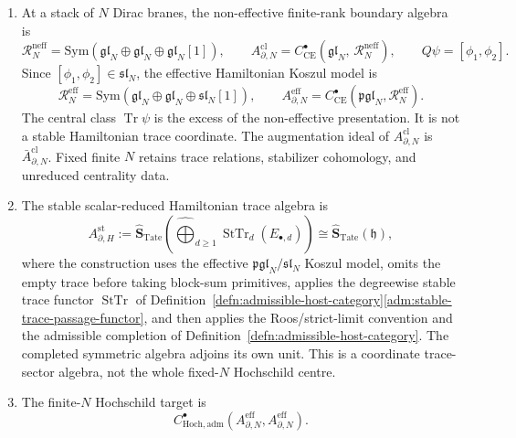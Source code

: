 \begin{defn}
\begin{enumerate}[label=\textup{(\roman*)}]
    These statements are
    Proposition~\ref{prop:app-matlis-coadjoint-action},
    Lemma~\ref{lem:app-matlis-coadjoint-continuity}, and
    Proposition~\ref{prop:completion-promatlis-continuity}.
  \item At a stack of \(N\) Dirac branes, the non-effective finite-rank
    boundary algebra is
    \[
      \mathcal R_N^{\mathrm{neff}}
      =
      \mathrm{Sym}(\mathfrak{gl}_N\oplus\mathfrak{gl}_N
      \oplus\mathfrak{gl}_N[1]),
      \qquad
      A^{\mathrm{cl}}_{\partial,N}
      =
      C^\bullet_{\mathrm{CE}}\!\left(\mathfrak{gl}_N,\,
        \mathcal R_N^{\mathrm{neff}}\right),
      \qquad Q\psi=[\phi_1,\phi_2].
    \]
    Since \([\phi_1,\phi_2]\in\mathfrak{sl}_N\), the effective
    Hamiltonian Koszul model is
    \[
      \mathcal R_N^{\mathrm{eff}}
      =
      \mathrm{Sym}(\mathfrak{gl}_N\oplus\mathfrak{gl}_N
      \oplus\mathfrak{sl}_N[1]),
      \qquad
      A^{\mathrm{eff}}_{\partial,N}
      =
      C^\bullet_{\mathrm{CE}}(\mathfrak{pgl}_N,\mathcal R_N^{\mathrm{eff}}).
    \]
    The central class \(\operatorname{Tr}\psi\) is the excess of the
    non-effective presentation.  It is not a stable Hamiltonian trace
    coordinate.  The augmentation ideal of \(A^{\mathrm{cl}}_{\partial,N}\) is
    \(\bar A^{\mathrm{cl}}_{\partial,N}\).  Fixed finite \(N\) retains
    trace relations, stabilizer cohomology, and unreduced centrality
    data.
  \item The stable scalar-reduced Hamiltonian trace algebra is
    \[
      A_{\partial,H}^{\mathrm{st}}
      :=
      \widehat{\mathbf S}_{\mathrm{Tate}}
      \!\left(\widehat{\bigoplus}_{d\geq1}
        \operatorname{StTr}_d(E_{\bullet,d})\right)
      \cong
      \widehat{\mathbf S}_{\mathrm{Tate}}(\mathfrak h),
    \]
    where the construction uses the effective
    \(\mathfrak{pgl}_N/\mathfrak{sl}_N\) Koszul model, omits the empty
    trace before taking block-sum primitives, applies the degreewise
    stable trace functor \(\operatorname{StTr}\) of
    Definition~\ref{defn:admissible-host-category}\ref{adm:stable-trace-passage-functor},
    and then applies the Roos/strict-limit convention and the admissible
    completion of Definition~\ref{defn:admissible-host-category}.  The
    completed symmetric algebra adjoins its own unit.  This is a
    coordinate trace-sector algebra, not the whole fixed-\(N\)
    Hochschild centre.
  \item The finite-\(N\) Hochschild target is
    \[
      C^\bullet_{\mathrm{Hoch},\mathrm{adm}}
      (A^{\mathrm{eff}}_{\partial,N},A^{\mathrm{eff}}_{\partial,N}).
\]
\end{enumerate}
\end{defn}
